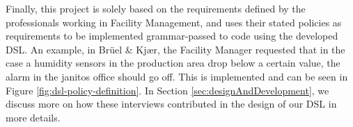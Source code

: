 Finally, this project is solely based on the requirements defined by the professionals working in Facility Management, and uses their stated policies as requirements to be implemented grammar-passed to code using the developed DSL. An example, in Br\"{u}el \& Kj\ae r, the Facility Manager requested that in the case a humidity sensors in the production area drop below a certain value, the alarm in the janitos office should go off. This is implemented and can be seen in Figure \ref{fig:dsl-policy-definition}. In Section \ref{sec:designAndDevelopment}, we discuss more on how these interviews contributed in the design of our DSL in more details.